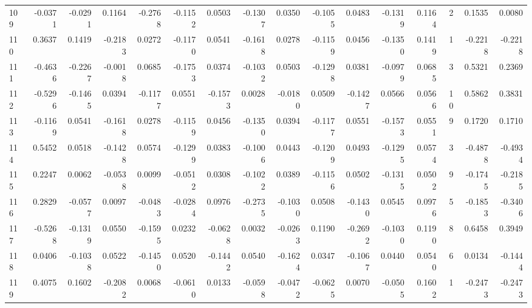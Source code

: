 \begin{tabular}{lrrrrrrrrrrrrrrr}
109 &     -0.0371 & -0.0291 &  0.1164 & -0.2768 & -0.1152 &  0.0503 & -0.1307 &  0.0350 & -0.1055 &  0.0483 &  -0.1319 &     0.1164 &      2 &                    0.1535 &                     0.0080 \\
110 &      0.3637 &  0.1419 & -0.2183 &  0.0272 & -0.1170 &  0.0541 & -0.1618 &  0.0278 & -0.1159 &  0.0456 &  -0.1350 &     0.1419 &      1 &                   -0.2218 &                    -0.2218 \\
111 &     -0.4636 & -0.2267 & -0.0018 &  0.0685 & -0.1753 &  0.0374 & -0.1032 &  0.0503 & -0.1298 &  0.0381 &  -0.0979 &     0.0685 &      3 &                    0.5321 &                     0.2369 \\
112 &     -0.5296 & -0.1465 &  0.0394 & -0.1177 &  0.0551 & -0.1573 &  0.0028 & -0.0180 &  0.0509 & -0.1427 &   0.0566 &     0.0566 &     10 &                    0.5862 &                     0.3831 \\
113 &     -0.1169 &  0.0541 & -0.1618 &  0.0278 & -0.1159 &  0.0456 & -0.1350 &  0.0394 & -0.1177 &  0.0551 &  -0.1573 &     0.0551 &      9 &                    0.1720 &                     0.1710 \\
114 &      0.5452 &  0.0518 & -0.1428 &  0.0574 & -0.1299 &  0.0383 & -0.1006 &  0.0443 & -0.1209 &  0.0493 &  -0.1295 &     0.0574 &      3 &                   -0.4878 &                    -0.4934 \\
115 &      0.2247 &  0.0062 & -0.0538 &  0.0099 & -0.0512 &  0.0308 & -0.1022 &  0.0389 & -0.1156 &  0.0502 &  -0.1315 &     0.0502 &      9 &                   -0.1745 &                    -0.2185 \\
116 &      0.2829 & -0.0577 &  0.0097 & -0.0483 & -0.0284 &  0.0976 & -0.2735 & -0.1030 &  0.0508 & -0.1430 &   0.0545 &     0.0976 &      5 &                   -0.1853 &                    -0.3406 \\
117 &     -0.5268 & -0.1319 &  0.0550 & -0.1595 &  0.0232 & -0.0628 &  0.0032 & -0.0263 &  0.1190 & -0.2692 &  -0.1030 &     0.1190 &      8 &                    0.6458 &                     0.3949 \\
118 &      0.0406 & -0.1038 &  0.0522 & -0.1450 &  0.0520 & -0.1442 &  0.0540 & -0.1624 &  0.0347 & -0.1067 &   0.0440 &     0.0540 &      6 &                    0.0134 &                    -0.1444 \\
119 &      0.4075 &  0.1602 & -0.2082 &  0.0068 & -0.0610 &  0.0133 & -0.0598 & -0.0472 & -0.0625 &  0.0070 &  -0.0505 &     0.1602 &      1 &                   -0.2473 &                    -0.2473 \\

\end{tabular}
